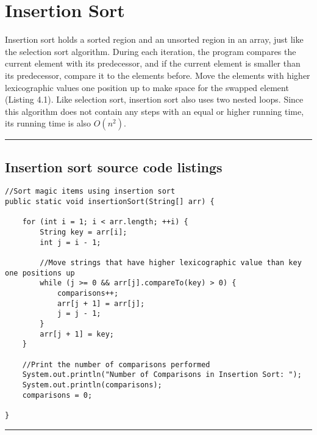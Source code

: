 \documentclass[letterpaper, 10pt,DIV=13]{scrartcl}
\numberwithin{equation}{section} %
\numberwithin{figure}{section} %
\numberwithin{table}{section} %
\newcommand{\horrule}[1]{\rule{\linewidth}{#1}} %
\begin{document}
\section{Insertion Sort}\label{operations}
Insertion sort holds a sorted region and an unsorted region in an array, just like the selection sort algorithm. During each iteration, the program compares the current element with its predecessor, and if the current element is smaller than its predecessor, compare it to the elements before. Move the elements with higher lexicographic values one position up to make space for the swapped element (Listing 4.1). Like selection sort, insertion sort also uses two nested loops. Since this algorithm does not contain any steps with an equal or higher running time, its running time is also $O(n^2)$.

\horrule{0pt}  	%

\subsection{Insertion sort source code listings}
\lstset{numbers=left, numberstyle=\tiny, stepnumber=1, numbersep=5pt, basicstyle=\footnotesize\ttfamily}
\begin{lstlisting}[frame=single, ] 
//Sort magic items using insertion sort
public static void insertionSort(String[] arr) {

    for (int i = 1; i < arr.length; ++i) {
        String key = arr[i];
        int j = i - 1;

        //Move strings that have higher lexicographic value than key one positions up
        while (j >= 0 && arr[j].compareTo(key) > 0) {
            comparisons++;
            arr[j + 1] = arr[j];
            j = j - 1;
        }
        arr[j + 1] = key;
    }

    //Print the number of comparisons performed
    System.out.println("Number of Comparisons in Insertion Sort: ");
    System.out.println(comparisons);
    comparisons = 0;

}
\end{lstlisting}

\horrule{0pt}  	%
\end{document}
